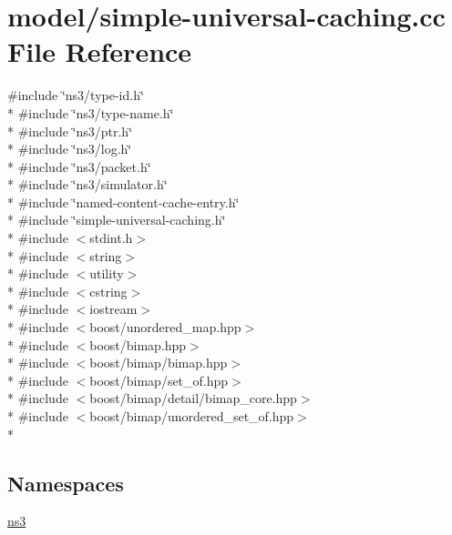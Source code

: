 \hypertarget{simple-universal-caching_8cc}{\section{model/simple-\/universal-\/caching.cc File Reference}
\label{simple-universal-caching_8cc}
}
{\ttfamily \#include \char`\"{}ns3/type-\/id.\-h\char`\"{}}\\*
{\ttfamily \#include \char`\"{}ns3/type-\/name.\-h\char`\"{}}\\*
{\ttfamily \#include \char`\"{}ns3/ptr.\-h\char`\"{}}\\*
{\ttfamily \#include \char`\"{}ns3/log.\-h\char`\"{}}\\*
{\ttfamily \#include \char`\"{}ns3/packet.\-h\char`\"{}}\\*
{\ttfamily \#include \char`\"{}ns3/simulator.\-h\char`\"{}}\\*
{\ttfamily \#include \char`\"{}named-\/content-\/cache-\/entry.\-h\char`\"{}}\\*
{\ttfamily \#include \char`\"{}simple-\/universal-\/caching.\-h\char`\"{}}\\*
{\ttfamily \#include $<$stdint.\-h$>$}\\*
{\ttfamily \#include $<$string$>$}\\*
{\ttfamily \#include $<$utility$>$}\\*
{\ttfamily \#include $<$cstring$>$}\\*
{\ttfamily \#include $<$iostream$>$}\\*
{\ttfamily \#include $<$boost/unordered\-\_\-map.\-hpp$>$}\\*
{\ttfamily \#include $<$boost/bimap.\-hpp$>$}\\*
{\ttfamily \#include $<$boost/bimap/bimap.\-hpp$>$}\\*
{\ttfamily \#include $<$boost/bimap/set\-\_\-of.\-hpp$>$}\\*
{\ttfamily \#include $<$boost/bimap/detail/bimap\-\_\-core.\-hpp$>$}\\*
{\ttfamily \#include $<$boost/bimap/unordered\-\_\-set\-\_\-of.\-hpp$>$}\\*
\subsection*{Namespaces}
\begin{DoxyCompactItemize}
\item 
\hyperlink{namespacens3}{ns3}
\end{DoxyCompactItemize}
